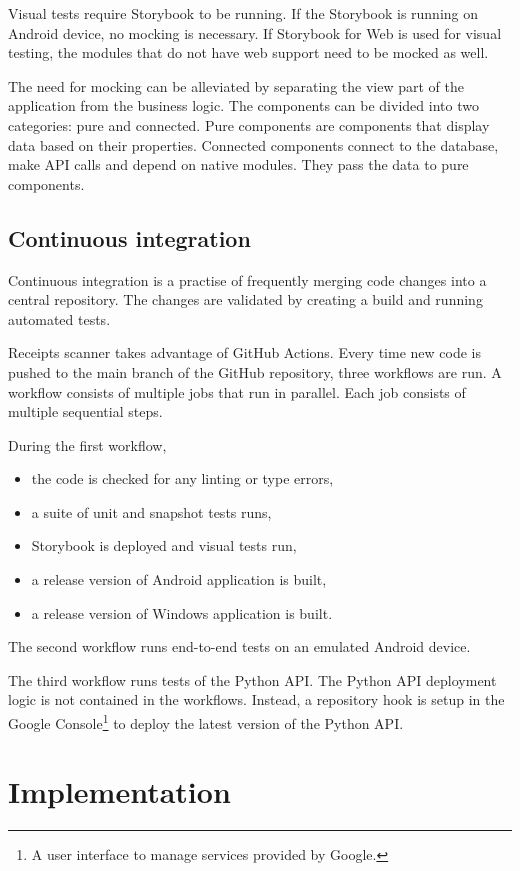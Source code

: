 \documentclass[
  digital, %
  table,   %
  oneside, %
  lof,     %
  lot,     %
]{fithesis3}
\begin{document}
Visual tests require Storybook to be running. If the Storybook is running on Android device, no mocking is necessary. If Storybook for Web is used for visual testing, the modules that do not have web support need to be mocked as well.

The need for mocking can be alleviated by separating the view part of the application from the business logic.
The components can be divided into two categories: pure and connected. Pure components are components that display data based on their properties. Connected components connect to the database, make API calls and depend on native modules. They pass the data to pure components.

\section{Continuous integration}
\label{sec:continuous_integration}
Continuous integration is a practise of frequently merging code changes into a central repository. The changes are validated by creating a build and running automated tests. \cite{Fowler2006Continuous}

Receipts scanner takes advantage of GitHub Actions. Every time new code is pushed to the main branch of the GitHub repository, three workflows are run. A workflow consists of multiple jobs that run in parallel. Each job consists of multiple sequential steps.

During the first workflow,
\begin{itemize}
    \item the code is checked for any linting or type errors,
    \item a suite of unit and snapshot tests runs,
    \item Storybook is deployed and visual tests run,
    \item a release version of Android application is built,
    \item a release version of Windows application is built.
\end{itemize}

The second workflow runs end-to-end tests on an emulated Android device.

The third workflow runs tests of the Python API. The Python API deployment logic is not contained in the workflows. Instead, a repository hook is setup in the Google Console\footnote{A user interface to manage services provided by Google.} to deploy the latest version of the Python API.

\chapter{Implementation}
\end{document}
